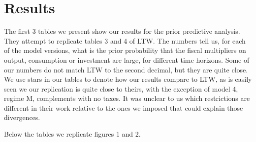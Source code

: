 \documentclass[letterpaper,12pt]{article}%
\begin{document}
\section{Results}
The first 3 tables we present show our results for the prior predictive analysis. They attempt to replicate tables 3 and 4 of LTW. The numbers tell us, for each of the model versions, what is the prior probability that the fiscal multipliers on output, consumption or investment are large, for different time horizons. Some of our numbers do not match LTW to the second decimal, but they are quite close. We use stars in our tables to denote how our results compare to LTW, as is easily seen we our replication is quite close to theirs, with the exception of model 4, regime M, complements with no taxes. It was unclear to us which restrictions are different in their work relative to the ones we imposed that could explain those divergences.

Below the tables we replicate figures 1 and 2.
\end{document}
